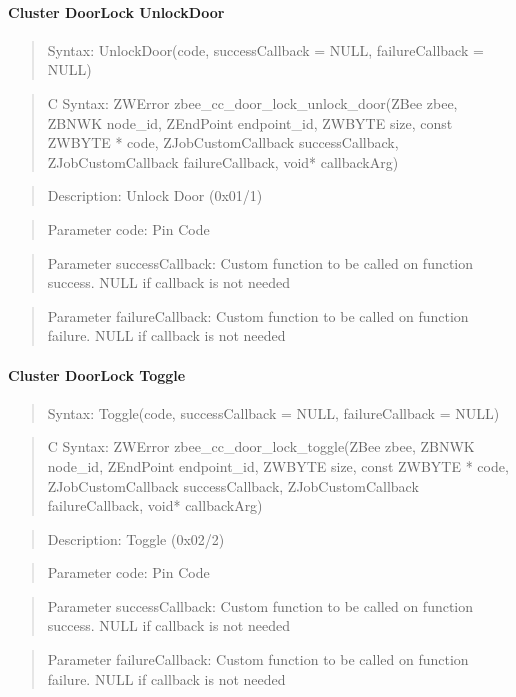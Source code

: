 \paragraph{Cluster DoorLock UnlockDoor}
\begin{quote}Syntax: UnlockDoor(code, successCallback = NULL, failureCallback = NULL)\end{quote}
\begin{quote}C Syntax: ZWError zbee\_cc\_door\_lock\_unlock\_door(ZBee zbee, ZBNWK node\_id, ZEndPoint endpoint\_id, ZWBYTE size, const ZWBYTE * code, ZJobCustomCallback successCallback, ZJobCustomCallback failureCallback, void* callbackArg)\end{quote}
\begin{quote}Description: Unlock Door (0x01/1)\end{quote}
\begin{quote}Parameter code: Pin Code\end{quote}
\begin{quote}Parameter successCallback: Custom function to be called on function success. NULL if callback is not needed\end{quote}
\begin{quote}Parameter failureCallback: Custom function to be called on function failure. NULL if callback is not needed\end{quote}


\paragraph{Cluster DoorLock Toggle}
\begin{quote}Syntax: Toggle(code, successCallback = NULL, failureCallback = NULL)\end{quote}
\begin{quote}C Syntax: ZWError zbee\_cc\_door\_lock\_toggle(ZBee zbee, ZBNWK node\_id, ZEndPoint endpoint\_id, ZWBYTE size, const ZWBYTE * code, ZJobCustomCallback successCallback, ZJobCustomCallback failureCallback, void* callbackArg)\end{quote}
\begin{quote}Description: Toggle (0x02/2)\end{quote}
\begin{quote}Parameter code: Pin Code\end{quote}
\begin{quote}Parameter successCallback: Custom function to be called on function success. NULL if callback is not needed\end{quote}
\begin{quote}Parameter failureCallback: Custom function to be called on function failure. NULL if callback is not needed\end{quote}


